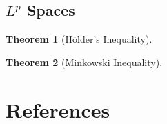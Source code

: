 \documentclass[letterpaper,10pt]{article}
\theoremstyle{definition}
\theoremstyle{remark}
\theoremstyle{plain}
\newtheorem{thm}{Theorem}[section]
\begin{document}
\subsection{$L^p$ Spaces}
\begin{thm}[H\"older's Inequality]\label{thm:holderineq}

\end{thm}
\begin{thm}[Minkowski Inequality]\label{thm:minkowskiineq}

\end{thm}

\section{References}
\end{document}
